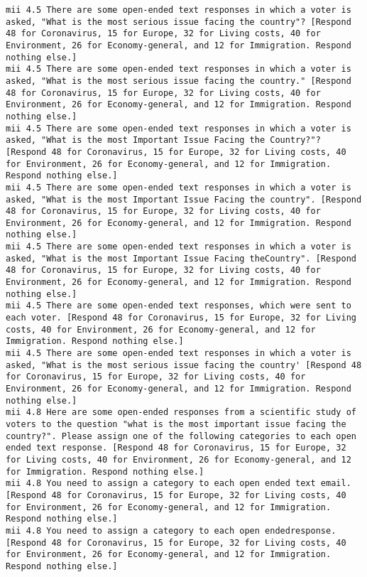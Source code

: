 \begin{lstlisting}[label=lst:promptvariants]
mii	4.5	There are some open-ended text responses in which a voter is asked, "What is the most serious issue facing the country"? [Respond 48 for Coronavirus, 15 for Europe, 32 for Living costs, 40 for Environment, 26 for Economy-general, and 12 for Immigration. Respond nothing else.]
mii	4.5	There are some open-ended text responses in which a voter is asked, "What is the most serious issue facing the country." [Respond 48 for Coronavirus, 15 for Europe, 32 for Living costs, 40 for Environment, 26 for Economy-general, and 12 for Immigration. Respond nothing else.]
mii	4.5	There are some open-ended text responses in which a voter is asked, "What is the most Important Issue Facing the Country?"? [Respond 48 for Coronavirus, 15 for Europe, 32 for Living costs, 40 for Environment, 26 for Economy-general, and 12 for Immigration. Respond nothing else.]
mii	4.5	There are some open-ended text responses in which a voter is asked, "What is the most Important Issue Facing the country". [Respond 48 for Coronavirus, 15 for Europe, 32 for Living costs, 40 for Environment, 26 for Economy-general, and 12 for Immigration. Respond nothing else.]
mii	4.5	There are some open-ended text responses in which a voter is asked, "What is the most Important Issue Facing theCountry". [Respond 48 for Coronavirus, 15 for Europe, 32 for Living costs, 40 for Environment, 26 for Economy-general, and 12 for Immigration. Respond nothing else.]
mii	4.5	There are some open-ended text responses, which were sent to each voter. [Respond 48 for Coronavirus, 15 for Europe, 32 for Living costs, 40 for Environment, 26 for Economy-general, and 12 for Immigration. Respond nothing else.]
mii	4.5	There are some open-ended text responses in which a voter is asked, "What is the most serious issue facing the country' [Respond 48 for Coronavirus, 15 for Europe, 32 for Living costs, 40 for Environment, 26 for Economy-general, and 12 for Immigration. Respond nothing else.]
mii	4.8	Here are some open-ended responses from a scientific study of voters to the question "what is the most important issue facing the country?". Please assign one of the following categories to each open ended text response. [Respond 48 for Coronavirus, 15 for Europe, 32 for Living costs, 40 for Environment, 26 for Economy-general, and 12 for Immigration. Respond nothing else.]
mii	4.8	You need to assign a category to each open ended text email. [Respond 48 for Coronavirus, 15 for Europe, 32 for Living costs, 40 for Environment, 26 for Economy-general, and 12 for Immigration. Respond nothing else.]
mii	4.8	You need to assign a category to each open endedresponse. [Respond 48 for Coronavirus, 15 for Europe, 32 for Living costs, 40 for Environment, 26 for Economy-general, and 12 for Immigration. Respond nothing else.]

\end{lstlisting}
